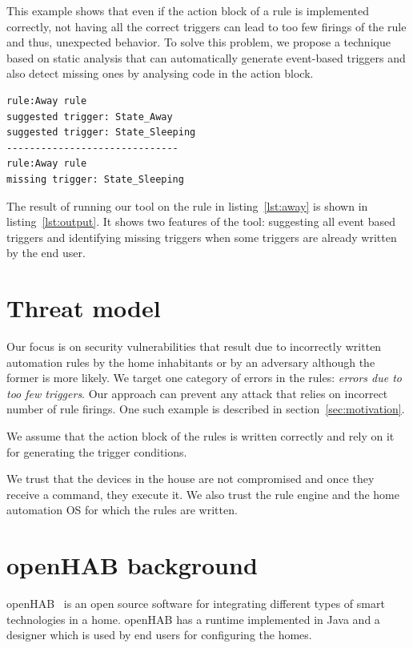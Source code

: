 \documentclass{sig-alternate-05-2015}
\begin{document}
This example shows that even if the action block of a rule is implemented correctly, not having all the correct triggers can lead to too few firings of the rule and thus, unexpected behavior. To solve this problem, we propose a technique based on static analysis that can automatically generate event-based triggers and also detect missing ones by analysing code in the action block. 
\begin{lstlisting}[caption={List of suggested and missing triggers shown by our tool for the Away rule.},label={lst:output}]
rule:Away rule
suggested trigger: State_Away
suggested trigger: State_Sleeping
------------------------------
rule:Away rule
missing trigger: State_Sleeping
\end{lstlisting}
The result of running our tool on the rule in listing~\ref{lst:away} is shown in listing~\ref{lst:output}. It shows two features of the tool: suggesting all event based triggers and identifying missing triggers when some triggers are already written by the end user.

\section{Threat model}
Our focus is on security vulnerabilities that result due to incorrectly written automation rules by the home inhabitants or by an adversary although the former is more likely. 
We target one category of errors in the rules: \textit{errors due to too few triggers}. Our approach can prevent any attack that relies on incorrect number of rule firings. One such example is described in section~\ref{sec:motivation}.

We assume that the action block of the rules is written correctly and rely on it for generating the trigger conditions.

We trust that the devices in the house are not compromised and once they receive a command, they execute it. We also trust the rule engine and the home automation OS for which the rules are written.

\section{\MakeLowercase{open}HAB background}
openHAB~\cite{openhab} is an open source software for integrating different types of smart technologies in a home. openHAB has a runtime implemented in Java and a designer which is used by end users for configuring the homes. 
\end{document}
